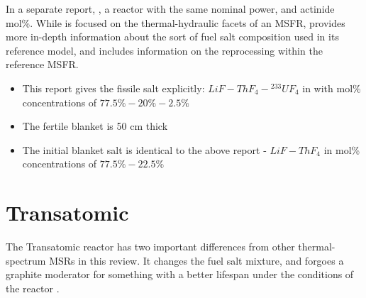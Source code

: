 \documentclass[letterpaper]{article}
\begin{document}
In a separate report, \cite{doligez_coupled_2014} , a reactor with the same nominal power, and actinide mol\%.   While \cite{rouch_preliminary_2014} is focused on the thermal-hydraulic facets of an MSFR, \cite{doligez_coupled_2014} provides more in-depth information about the sort of fuel salt composition used in its reference model, and includes information on the reprocessing within the reference MSFR.

\begin{itemize}
\item This report gives the fissile salt explicitly: $LiF - ThF_4 - {}^{233}UF_4$ in with mol\% concentrations of $77.5\% - 20\% - 2.5\%$
\item The fertile blanket is 50 cm thick
\item The initial blanket salt is identical to the above report - $LiF - ThF_4$ in mol\% concentrations of $77.5\% - 22.5\%$

\end{itemize}

\section{Transatomic}

The Transatomic reactor has two important differences from other thermal-spectrum MSRs in this review.  It changes the fuel salt mixture, and forgoes a graphite moderator for something with a better lifespan under the conditions of the reactor \cite{robertson_assessment_2017}.
\end{document}
